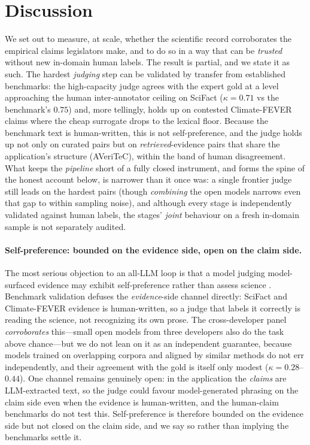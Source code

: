 \section{Discussion}
\label{sec:discussion}

We set out to measure, at scale, whether the scientific record corroborates the empirical claims
legislators make, and to do so in a way that can be \emph{trusted} without new in-domain human labels.
The result is partial, and we state it as such. The hardest \emph{judging} step can be validated by
transfer from established benchmarks: the high-capacity judge agrees with the expert gold at a level
approaching the human inter-annotator ceiling on SciFact ($\kappa=0.71$ vs the benchmark's $0.75$) and,
more tellingly, holds up on contested Climate-FEVER claims where the cheap surrogate drops to the
lexical floor. Because the benchmark text is human-written, this is not self-preference, and the judge holds up not only
on curated pairs but on \emph{retrieved}-evidence pairs that share the application's structure (AVeriTeC),
within the band of human disagreement. What keeps the \emph{pipeline} short of a fully closed instrument,
and forms the spine of the honest account below, is narrower than it once was: a single frontier judge
still leads on the hardest pairs (though \emph{combining} the open models narrows even that gap to within
sampling noise), and although every stage is independently validated against human labels, the stages'
\emph{joint} behaviour on a fresh in-domain sample is not separately audited.

\paragraph{Self-preference: bounded on the evidence side, open on the claim side.} The most serious
objection to an all-LLM loop is that a model judging model-surfaced evidence may exhibit self-preference
rather than assess science \citep{panickssery2024llm}. Benchmark validation defuses the
\emph{evidence}-side channel directly: SciFact and Climate-FEVER evidence is human-written, so a judge
that labels it correctly is reading the science, not recognizing its own prose. The cross-developer
panel \emph{corroborates} this---small open models from three developers also do the task above
chance---but we do not lean on it as an independent guarantee, because models trained on overlapping
corpora and aligned by similar methods do not err independently, and their agreement with the gold is
itself only modest ($\kappa=0.28$--$0.44$). One channel remains genuinely open: in the application the
\emph{claims} are LLM-extracted text, so the judge could favour model-generated phrasing on the claim
side even when the evidence is human-written, and the human-claim benchmarks do not test this.
Self-preference is therefore bounded on the evidence side but not closed on the claim side, and we say
so rather than implying the benchmarks settle it.

